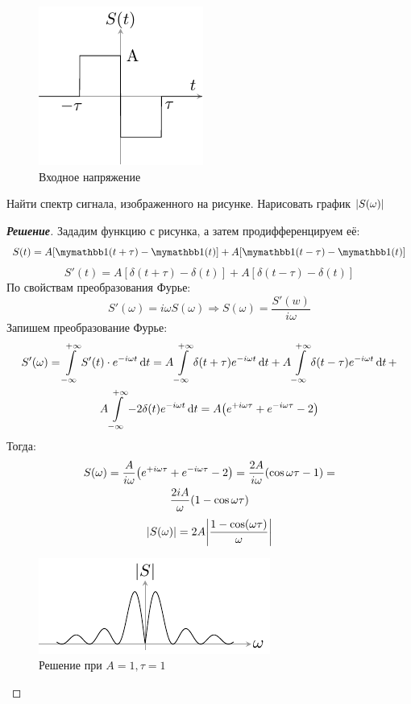 \begin{figure}[h!]
	\centering
	\includegraphics[width=0.4\linewidth]{ris/task15_input}
	\caption{Входное напряжение}
	\label{fig:15.1}
\end{figure}

\begin{task}
	Найти спектр сигнала, изображенного на рисунке. Нарисовать график $\abs{S(\omega)}$
\end{task}

\begin{proof}[\rm{\textbf{Решение}}]
	Зададим функцию с рисунка, а затем продифференцируем её:
	$$S(t)=A[\H(t+\tau)-\H(t)]+A[\H(t-\tau)-\H(t)]$$
	$$S'(t)=A[\delta(t+\tau)-\delta(t)]+A[\delta(t- \tau)-\delta(t)] $$
	По свойствам преобразования Фурье:
	\begin{equation}
		S'(\omega)=i \omega S(\omega) \Longrightarrow S(\omega)
		=\frac{S'(w)}{i \omega}
	\end{equation}
	Запишем преобразование Фурье:
	\begin{gather*}
		S'(\omega)=\int\limits_{-\infty}^{+\infty} S'(t)\cdot e^{-i \omega t} \dd{t}=
		A \int\limits_{-\infty}^{+\infty} \delta(t+ \tau) e^{-i \omega t} \dd{t}+
		A \int\limits_{-\infty}^{+\infty} \delta(t- \tau) e^{-i \omega t} \dd{t}+\\
		A \int\limits_{-\infty}^{+\infty} -2\delta(t) e^{-i \omega t} \dd{t}=
		A \qty(e^{+ i \omega \tau}+e^{-i \omega \tau}-2 )
	\end{gather*}
	Тогда:
	\begin{gather*}
		S(\omega)=\frac{A}{i \omega}
		\qty(e^{+ i \omega \tau}+e^{-i \omega \tau}-2 )=
		\frac{2A}{i \omega}(\cos{\omega \tau}-1)=
		\\
		\frac{2iA}{\omega}(1-\cos{\omega \tau})
	\end{gather*}
	\begin{equation}
		\abs{S(\omega)}=2A\abs{ \frac{1-\cos(\omega \tau)}{\omega} }
	\end{equation}
\begin{figure}[h!]
	\centering
	\includegraphics[width=0.7\linewidth]{ris/task15_out}
	\caption{Решение при $A=1,\tau=1$}
	\label{fig:15.2}
\end{figure}

\end{proof}

